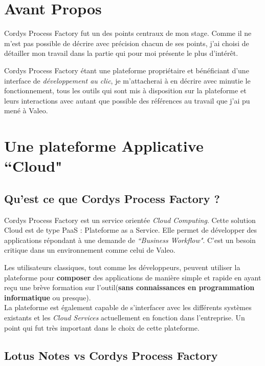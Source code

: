 \section*{Avant Propos}

Cordys Process Factory fut un des points centraux de mon stage. Comme il ne m'est pas possible de décrire avec précision chacun de ses points, j'ai choisi de détailler mon travail dans la partie qui pour moi présente le plus d'intérêt. 

Cordys Process Factory étant une plateforme propriétaire et bénéficiant d'une interface de \emph{développement au clic}, je m'attacherai à en décrire avec minutie le fonctionnement, tous les outils qui sont mis à disposition sur la plateforme et leurs interactions avec autant que possible des références au travail que j'ai pu mené à Valeo.

\section{Une plateforme Applicative ``Cloud"}

\subsection{Qu'est ce que Cordys Process Factory ?}

Cordys Process Factory est un service orientée \textit{Cloud Computing}. Cette solution Cloud est de type PaaS : Plateforme as a Service. Elle permet de développer des applications répondant à une demande de \textit{``Business Workflow"}. C'est un besoin critique dans un environnement comme celui de Valeo. 

Les utilisateurs classiques, tout comme les développeurs, peuvent utiliser la plateforme pour \textbf{composer} des applications de manière simple et rapide en ayant reçu une brève formation sur l'outil(\textbf{sans connaissances en programmation informatique} ou presque). \\
La plateforme est également capable de s'interfacer avec les différents systèmes existants et les \textit{Cloud Services} actuellement en fonction dans l'entreprise. Un point qui fut très important dans le choix de cette plateforme.

\clearpage

\subsection{Lotus Notes vs Cordys Process Factory}

